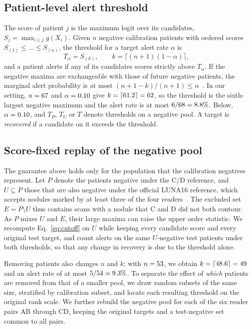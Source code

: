 \subsection{Patient-level alert threshold}
\label{sec:cutoff}

The score of patient $j$ is the maximum logit over its candidates, $S_j=\max_{i\in j}g(X_i)$. Given $n$ negative calibration patients with ordered scores $S_{(1)}\le\dots\le S_{(n)}$, the threshold for a target alert rate $\alpha$ is
\begin{equation}
 T_\alpha=S_{(k)},\qquad k=\lceil(n+1)(1-\alpha)\rceil ,
 \label{eq:cutoff}
\end{equation}
and a patient alerts if any of its candidates scores strictly above $T_\alpha$. If the negative maxima are exchangeable with those of future negative patients, the marginal alert probability is at most $(n+1-k)/(n+1)\le\alpha$~\cite{angelopoulos2023conformal}. In our setting, $n=67$ and $\alpha=0.10$ give $k=\lceil 61.2\rceil=62$, so the threshold is the sixth-largest negative maximum and the alert rate is at most $6/68=8.8\%$. Below, $\alpha=0.10$, and $T_P$, $T_U$ or $T$ denote thresholds on a negative pool. A target is \emph{recovered} if a candidate on it exceeds the threshold.

\subsection{Score-fixed replay of the negative pool}
\label{sec:replay}

The guarantee above holds only for the population that the calibration negatives represent. Let $P$ denote the patients negative under the C/D reference, and $U\subseteq P$ those that are also negative under the official LUNA16 reference, which accepts nodules marked by at least three of the four readers~\cite{setio2017}. The excluded set $E=P\setminus U$ thus contains scans with a nodule that C and D did not both contour. As $P$ mixes $U$ and $E$, their large maxima can raise the upper order statistic. We recompute Eq.~\eqref{eq:cutoff} on $U$ while keeping every candidate score and every original test target, and count alerts on the same $U$-negative test patients under both thresholds, so that any change in recovery is due to the threshold alone.

Removing patients also changes $n$ and $k$; with $n=53$, we obtain $k=\lceil 48.6\rceil=49$ and an alert rate of at most $5/54=9.3\%$. To separate the effect of \emph{which} patients are removed from that of a smaller pool, we draw \NRandom{} random subsets of the same size, stratified by calibration subset, and locate each resulting threshold on the original rank scale. We further rebuild the negative pool for each of the six reader pairs AB through CD, keeping the original targets and a test-negative set common to all pairs.
